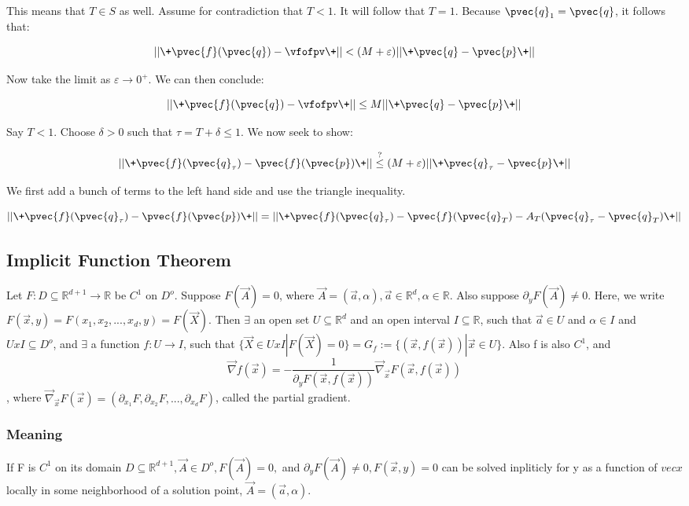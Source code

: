 \documentclass[11 pt, twoside]{article}
\begin{document}
This means that $T \in S$ as well. Assume for contradiction that $T < 1$. It
will follow that $T = 1$. Because $\pvec{q}_1 = \pvec{q}$, it follows that:

$$ ||\+\pvec{f}(\pvec{q}) - \vfofpv\+|| < (M + \varepsilon) ||\+\pvec{q} - \pvec{p}\+||$$

Now take the limit as $\varepsilon \to 0^+$. We can then conclude:

$$ ||\+\pvec{f}(\pvec{q}) - \vfofpv\+|| \leq M ||\+\pvec{q} - \pvec{p}\+||$$

Say $T < 1$. Choose $\delta > 0$ such that $\tau = T + \delta \leq 1$. We now
seek to show:

$$ ||\+\pvec{f}(\pvec{q}_{\tau}) - \pvec{f}(\pvec{p})\+|| \overset{?}{\leq} (M +
\varepsilon) ||\+\pvec{q}_{\tau} - \pvec{p}\+||$$

We first add a bunch of terms to the left hand side and use the triangle
inequality.

$$ ||\+\pvec{f}(\pvec{q}_{\tau}) - \pvec{f}(\pvec{p})\+|| =
||\+\pvec{f}(\pvec{q}_{\tau}) - \pvec{f}(\pvec{q}_T) - A_T(\pvec{q}_{\tau} -
\pvec{q}_T)\+||$$


\subsection{Implicit Function Theorem}
Let $F: D \subseteq \mathbb{R}^{d+1} \to \mathbb{R}$ be $C^1$ on $D^o$. Suppose $F(\vec{A}) = 0$, where $\vec{A} = (\vec{a}, \alpha), \vec{a} \in \mathbb{R}^d, \alpha \in \mathbb{R}$. Also suppose $\partial_yF(\vec{A}) \neq 0$. Here, we write $F(\vec{x}, y) = F(x_1, x_2, ..., x_d, y) = F(\vec{X})$. Then $\exists$ an open set $U \subseteq \mathbb{R}^d$ and an open interval $I \subseteq \mathbb{R}$, such that $\vec{a} \in U$ and $\alpha \in I$ and $U x I \subseteq D^o$, and $\exists$ a function $f: U \to I$, such that $\{\vec{X} \in U x I|F(\vec{X}) = 0\} = G_f := \{(\vec{x}, f(\vec{x}))|\vec{x} \in U\}$. Also f is also $C^1$, and $$\vec{\nabla}f(\vec{x}) = -\frac{1}{\partial_yF(\vec{x}, f(\vec{x}))}\vec{\nabla}_\vec{x}F(\vec{x}, f(\vec{x}))$$, where $\vec{\nabla}_\vec{x}F(\vec{x}) = (\partial_{x_1}F, \partial_{x_2}F, ..., \partial_{x_d}F)$, called the partial gradient.

\subsubsection{Meaning}
If F is $C^1$ on its domain $D \subseteq \mathbb{R}^{d+1}, \vec{A} \in D^o, F(\vec{A}) = 0,$ and $\partial_yF(\vec{A}) \neq 0, F(\vec{x}, y) = 0$ can be solved inpliticly for y as a function of $vec{x}$ locally in some neighborhood of a solution point, $\vec{A} = (\vec{a}, \alpha)$.
\end{document}

